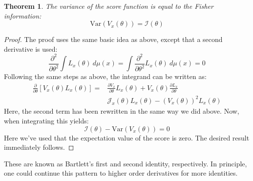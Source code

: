 \documentclass[12pt, a4paper]{article}
\newtheorem{theorem}{Theorem}[section]
\numberwithin{equation}{section}
\begin{document}
\begin{theorem}
The variance of the score function is equal to the Fisher information:
\begin{equation}
\textrm{Var}(V_x(\theta))=\mathcal{I}(\theta)
\end{equation}
\end{theorem}
\begin{proof}
The proof uses the same basic idea as above, except that a second derivative is used:
\begin{equation}
\frac{\partial^2}{\partial\theta^2}\int L_x(\theta)\ d\mu(x)=\int\frac{\partial^2}{\partial\theta^2}L_x(\theta)\ d\mu(x)=0
\end{equation}
Following the same steps as above, the integrand can be written as:
\begin{align}
\frac{\partial}{\partial\theta}\left[V_x(\theta)L_x(\theta)\right]=&\frac{\partial V_x}{\partial\theta}L_x(\theta)+V_x(\theta)\frac{\partial L_x}{\partial\theta} \\
&\mathcal{J}_x(\theta)L_x(\theta)-\left(V_x(\theta)\right)^2 L_x(\theta)
\end{align}
Here, the second term has been rewritten in the same way we did above. Now, when integrating this yields:
\begin{equation}
\mathcal{I}(\theta)-\textrm{Var}(V_x(\theta))=0
\end{equation}
Here we've used that the expectation value of the score is zero. The desired result immediately follows.
\end{proof}

These are known as Bartlett's first and second identity, respectively. In principle, one could continue this pattern to higher order derivatives for more identities.
\end{document}
